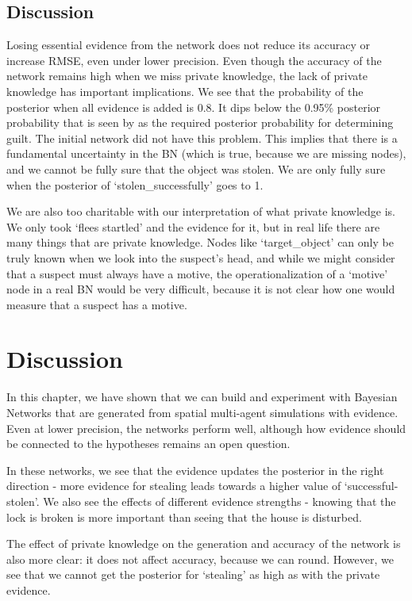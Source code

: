 \subsection{Discussion}
Losing essential evidence from the network does not reduce its accuracy or increase RMSE, even under lower precision. Even though the accuracy of the network remains high when we miss private knowledge, the lack of private knowledge has important implications. We see that the probability of the posterior when all evidence is added is 0.8. It dips below the 0.95\% posterior probability that is seen by \citet{Fenton2019} as the required posterior probability for determining guilt. The initial network did not have this problem. This implies that there is a fundamental uncertainty in the BN (which is true, because we are missing nodes), and we cannot be fully sure that the object was stolen. We are only fully sure when the posterior of `stolen\_successfully' goes to 1.

We are also too charitable with our interpretation of what private knowledge is. We only took `flees startled' and the evidence for it, but in real life there are many things that are private knowledge. Nodes like `target\_object' can only be truly known when we look into the suspect's head, and while we might consider that a suspect must always have a motive, the operationalization of a `motive' node in a real BN would be very difficult, because it is not clear how one would measure that a suspect has a motive.



\section{Discussion}

In this chapter, we have shown that we can build and experiment with Bayesian Networks that are generated from spatial multi-agent simulations with evidence. Even at lower precision, the networks perform well, although how evidence should be connected to the hypotheses remains an open question. 

In these networks, we see that the evidence updates the posterior in the right direction - more evidence for stealing leads towards a higher value of `successful-stolen'. We also see the effects of different evidence strengths - knowing that the lock is broken is more important than seeing that the house is disturbed.

The effect of private knowledge on the generation and accuracy of the network is also more clear: it does not affect accuracy, because we can round. However, we see that we cannot get the posterior for `stealing' as high as with the private evidence.






